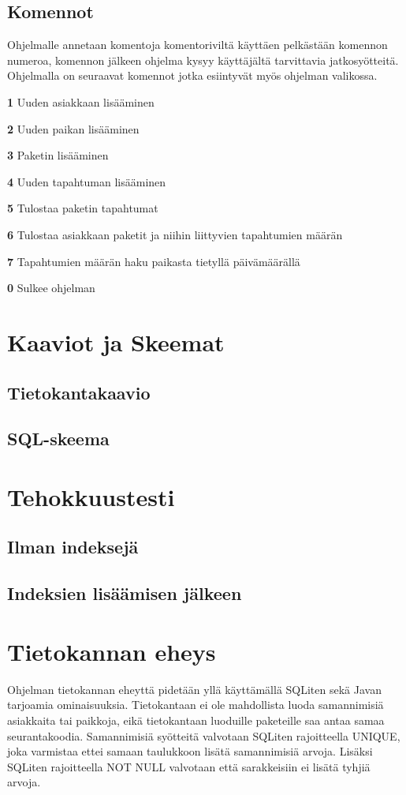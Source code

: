 \documentclass[11pt,a4paper]{article}
\begin{document}
\subsection*{Komennot}
Ohjelmalle annetaan komentoja komentoriviltä käyttäen pelkästään komennon numeroa, komennon jälkeen ohjelma kysyy käyttäjältä tarvittavia jatkosyötteitä. Ohjelmalla on seuraavat komennot jotka esiintyvät myös ohjelman valikossa.
\begin{description}
\item \textbf{1} Uuden asiakkaan lisääminen
\item \textbf{2} Uuden paikan lisääminen
\item \textbf{3} Paketin lisääminen
\item \textbf{4} Uuden tapahtuman lisääminen
\item \textbf{5} Tulostaa paketin tapahtumat
\item \textbf{6} Tulostaa asiakkaan paketit ja niihin liittyvien tapahtumien määrän
\item \textbf{7} Tapahtumien määrän haku paikasta tietyllä päivämäärällä
\item \textbf{0} Sulkee ohjelman 
\end{description}

\newpage
\section{Kaaviot ja Skeemat}
\subsection*{Tietokantakaavio}


\subsection*{SQL-skeema}

\newpage
\section{Tehokkuustesti}
\subsection*{Ilman indeksejä}
\subsection*{Indeksien lisäämisen jälkeen}

\newpage
\section{Tietokannan eheys}
Ohjelman tietokannan eheyttä pidetään yllä käyttämällä SQLiten sekä Javan tarjoamia ominaisuuksia.
Tietokantaan ei ole mahdollista luoda samannimisiä asiakkaita tai paikkoja, eikä tietokantaan luoduille paketeille saa antaa samaa seurantakoodia. Samannimisiä syötteitä valvotaan SQLiten rajoitteella UNIQUE, joka varmistaa ettei samaan taulukkoon lisätä samannimisiä arvoja. Lisäksi SQLiten rajoitteella NOT NULL valvotaan että sarakkeisiin ei lisätä tyhjiä arvoja.
 
\end{document}
